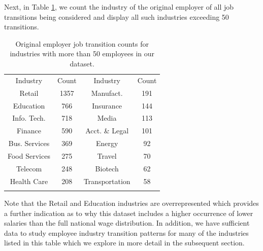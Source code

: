 \documentclass[10pt]{article}
\begin{document}
Next, in Table \ref{tab:indtab}, we count the industry of the original employer 
of all job transitions being considered and display all such industries exceeding 
50 transitions.
%
\begin{table}
  \centering
  \caption{Original employer job transition counts for industries 
    with more than 50 employees in our dataset.}
  \begin{tabular}{cccc}
    \rowcolor{gray!50}
      Industry & Count & Industry & Count \\
      Retail & 1357 & Manufact. & 191\\
      Education & 766 & Insurance & 144\\
      Info. Tech. & 718 & Media & 113\\
      Finance & 590 & Acct. \& Legal & 101\\
      Bus. Services & 369 & Energy & 92\\
      Food Services & 275  & Travel & 70\\
      Telecom & 248 & Biotech & 62\\
      Health Care & 208 & Transportation & 58\\
	\label{tab:indtab}
  \end{tabular}
\end{table}
%
Note that the Retail and Education industries are overrepresented which 
provides a further indication as to why this dataset includes a higher occurrence 
of lower salaries  than the full national wage distribution. In addition, we have sufficient data to study employee industry 
transition patterns for many of the industries listed in this table which 
we explore in more detail in the subsequent section.
\end{document}
